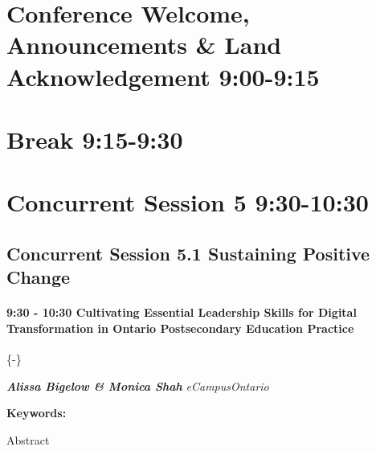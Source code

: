 \documentclass[
]{book}
\begin{document}
\hypertarget{conference-welcome-announcements-land-acknowledgement-900-915}{%
\section*{Conference Welcome, Announcements \& Land Acknowledgement \textbar{} 9:00-9:15}\label{conference-welcome-announcements-land-acknowledgement-900-915}}

\hypertarget{break-915-930}{%
\section*{Break \textbar{} 9:15-9:30}\label{break-915-930}}

\hypertarget{concurrent-session-5-930-1030}{%
\section*{Concurrent Session 5 \textbar{} 9:30-10:30}\label{concurrent-session-5-930-1030}}

\hypertarget{concurrent-session-5.1-sustaining-positive-change}{%
\subsection*{Concurrent Session 5.1 \textbar{} Sustaining Positive Change}\label{concurrent-session-5.1-sustaining-positive-change}}

\begin{session}
\hypertarget{cultivating-essential-leadership-skills-for-digital-transformation-in-ontario-postsecondary-education-practice}{%
\paragraph{\texorpdfstring{9:30 - 10:30 \textbar{} \textbf{Cultivating
Essential Leadership Skills for Digital Transformation in Ontario
Postsecondary Education} \textbar{}
Practice}{9:30 - 10:30 \textbar{} Cultivating Essential Leadership Skills for Digital Transformation in Ontario Postsecondary Education \textbar{} Practice}}\label{cultivating-essential-leadership-skills-for-digital-transformation-in-ontario-postsecondary-education-practice}}

\{-\}

\textbf{\emph{Alissa Bigelow \& Monica Shah}} \textbar{}
\emph{eCampusOntario}

\textbf{Keywords:}

Abstract
\end{session}
\end{document}
